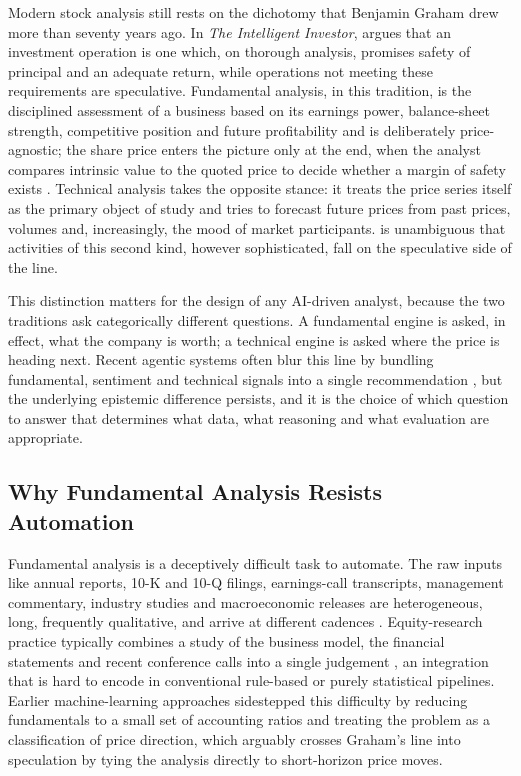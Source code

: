 Modern stock analysis still rests on the dichotomy that
Benjamin Graham drew more than seventy years ago. In
\emph{The Intelligent Investor}, \citet{Graham2006} argues that an
investment operation is one which, on thorough analysis, promises
safety of principal and an adequate return, while operations not
meeting these requirements are speculative. Fundamental analysis,
in this tradition, is the disciplined assessment of a business based on
its earnings power, balance-sheet strength, competitive position
and future profitability and is deliberately price-agnostic;
the share price enters the picture only at the end, when the analyst
compares intrinsic value to the quoted price to decide whether a
margin of safety exists \citep{Graham2006}. Technical analysis takes
the opposite stance: it treats the price series itself as the primary
object of study and tries to forecast future prices from past prices,
volumes and, increasingly, the mood of market participants. \citet{Graham2006} is unambiguous that activities
of this second kind, however sophisticated, fall on the speculative
side of the line.

This distinction matters for the design of any AI-driven analyst,
because the two traditions ask categorically different questions.
A fundamental engine is asked, in effect, what the company is worth;
a technical engine is asked where the price is heading next. Recent
agentic systems often blur this line by bundling fundamental,
sentiment and technical signals into a single recommendation
\citep{mattaparty2025,setyowidodo2025}, but the underlying epistemic
difference persists, and it is the choice of which question to
answer that determines what data, what reasoning and what evaluation
are appropriate.

\subsection{Why Fundamental Analysis Resists Automation}
\label{sec:whyresist}

Fundamental analysis is a deceptively difficult task to automate.
The raw inputs like annual reports, 10-K and 10-Q filings,
earnings-call transcripts, management commentary, industry studies
and macroeconomic releases are heterogeneous, long, frequently
qualitative, and arrive at different cadences
\citep{Fatouros2025MarketSense}. Equity-research practice typically combines
a study of the business model, the financial statements and recent
conference calls into a single judgement \citep{dongare2024}, an
integration that is hard to encode in conventional rule-based or
purely statistical pipelines. Earlier machine-learning approaches
sidestepped this difficulty by reducing fundamentals to a small set
of accounting ratios and treating the problem as a classification
of price direction, which arguably crosses
Graham's line into speculation by tying the analysis directly to
short-horizon price moves.

